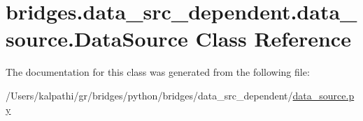 \hypertarget{classbridges_1_1data__src__dependent_1_1data__source_1_1_data_source}{}\section{bridges.\+data\+\_\+src\+\_\+dependent.\+data\+\_\+source.\+Data\+Source Class Reference}
\label{classbridges_1_1data__src__dependent_1_1data__source_1_1_data_source}


The documentation for this class was generated from the following file\+:\begin{DoxyCompactItemize}
\item 
/\+Users/kalpathi/gr/bridges/python/bridges/data\+\_\+src\+\_\+dependent/\mbox{\hyperlink{data__source_8py}{data\+\_\+source.\+py}}\end{DoxyCompactItemize}
